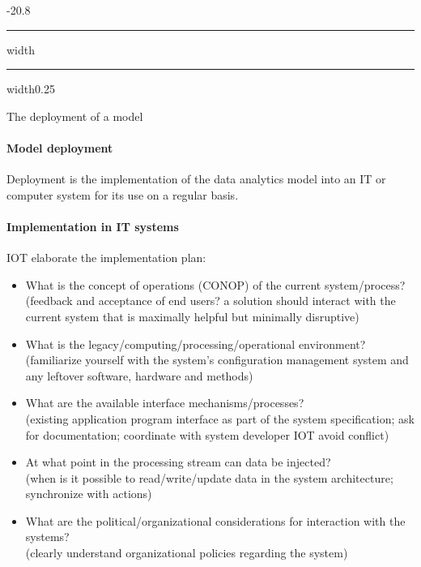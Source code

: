 \documentclass[a4paper, landscape, 6pt, fleqn]{scrartcl}
\makeatletter
\renewcommand{\section}{\@startsection{section}{1}{0mm}%
{-2\baselineskip}{0.8\baselineskip}%
{\hrule depth 0.2pt width\columnwidth\hrule depth1.5pt
width0.25\columnwidth\vspace*{1.2em}\Large\bfseries}}
\makeatother
\begin{document}
\begin{multicols*}{4}
\section{The deployment of a model}

\paragraph{Model deployment}

Deployment is the implementation of the data analytics model into an IT or computer system for its use on a regular basis.

\paragraph{Implementation in IT systems}

IOT elaborate the implementation plan:
\begin{itemize}
\item What is the concept of operations (CONOP) of the current system/process? \\
(feedback and acceptance of end users? a solution should interact with the current system that is maximally helpful but minimally disruptive)
\item What is the legacy/computing/processing/operational environment? \\
(familiarize yourself with the system's configuration management system and any leftover software, hardware and methods)
\item What are the available interface mechanisms/processes? \\
(existing application program interface as part of the system specification; ask for documentation; coordinate with system developer IOT avoid conflict)
\item At what point in the processing stream can data be injected? \\
(when is it possible to read/write/update data in the system architecture; synchronize with actions)
\item What are the political/organizational considerations for interaction with the systems? \\
(clearly understand organizational policies regarding the system)
\end{itemize}


\end{multicols*}
\end{document}
